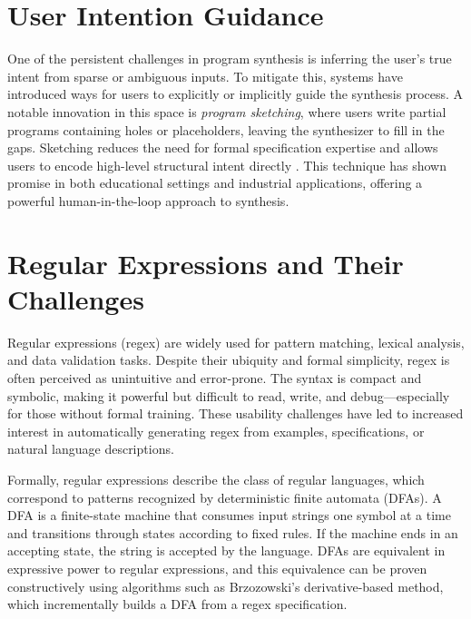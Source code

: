 \section{User Intention Guidance}

\vspace{-0.4em}

\indent\indent One of the persistent challenges in program synthesis is inferring the user's true intent from sparse or ambiguous inputs. To mitigate this, systems have introduced ways for users to explicitly or implicitly guide the synthesis process. A notable innovation in this space is \textit{program sketching}, where users write partial programs containing holes or placeholders, leaving the synthesizer to fill in the gaps. Sketching reduces the need for formal specification expertise and allows users to encode high-level structural intent directly \cite{solarlezama_2012_program}. This technique has shown promise in both educational settings and industrial applications, offering a powerful human-in-the-loop approach to synthesis.

\section{Regular Expressions and Their Challenges}

\vspace{-0.4em}

\indent\indent Regular expressions (regex) are widely used for pattern matching, lexical analysis, and data validation tasks. Despite their ubiquity and formal simplicity, regex is often perceived as unintuitive and error-prone. The syntax is compact and symbolic, making it powerful but difficult to read, write, and debug—especially for those without formal training. These usability challenges have led to increased interest in automatically generating regex from examples, specifications, or natural language descriptions.

\indent\indent Formally, regular expressions describe the class of regular languages, which correspond to patterns recognized by deterministic finite automata (DFAs). A DFA is a finite-state machine that consumes input strings one symbol at a time and transitions through states according to fixed rules. If the machine ends in an accepting state, the string is accepted by the language. DFAs are equivalent in expressive power to regular expressions, and this equivalence can be proven constructively using algorithms such as Brzozowski's derivative-based method, which incrementally builds a DFA from a regex specification. 




